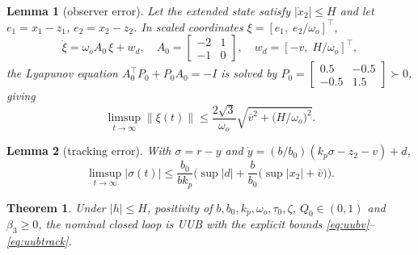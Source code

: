 \documentclass[journal]{IEEEtran}
\newtheorem{lemma}{Lemma}
\newtheorem{theorem}{Theorem}
\theoremstyle{remark}
\begin{document}
\begin{lemma}[observer error]\label{lem:eso}
Let the extended state satisfy $|\dot x_2|\le H$ and let $e_1=x_1-z_1$,
$e_2=x_2-z_2$. In scaled coordinates $\xi=[e_1,\;e_2/\omega_o]^{\!\top}$,
\begin{equation}
\dot\xi=\omega_o A_0\,\xi+w_d,\quad
A_0=\begin{bmatrix}-2&1\\-1&0\end{bmatrix},\quad
w_d=[-v,\;H/\omega_o]^{\!\top},
\label{eq:esiso}
\end{equation}
the Lyapunov equation $A_0^{\!\top}P_0+P_0A_0=-I$ is solved by
$P_0=\begin{bmatrix}0.5&-0.5\\-0.5&1.5\end{bmatrix}\succ0$, giving
\begin{equation}
\limsup_{t\to\infty}\|\xi(t)\|\le\frac{2\sqrt3}{\omega_o}
\sqrt{\bar v^{2}+\big(H/\omega_o\big)^{2}} .
\label{eq:uubeso}
\end{equation}
\end{lemma}

\begin{lemma}[tracking error]\label{lem:track}
With $\sigma=r-y$ and $\dot y=(b/b_0)(k_p\sigma-z_2-v)+d$,
\begin{equation}
\limsup_{t\to\infty}|\sigma(t)|\le\frac{b_0}{bk_p}
\Big(\sup|d|+\frac{b}{b_0}\big(\sup|x_2|+\bar v\big)\Big).
\label{eq:uubtrack}
\end{equation}
\end{lemma}

\begin{theorem}\label{thm:uub}
Under $|h|\le H$, positivity of $b,b_0,k_p,\omega_o,\tau_0,\zeta$, $Q_0\in(0,1)$ and
$\beta_3\ge0$, the nominal closed loop is UUB with the explicit bounds
\eqref{eq:uubv}--\eqref{eq:uubtrack}.
\end{theorem}
\end{document}
